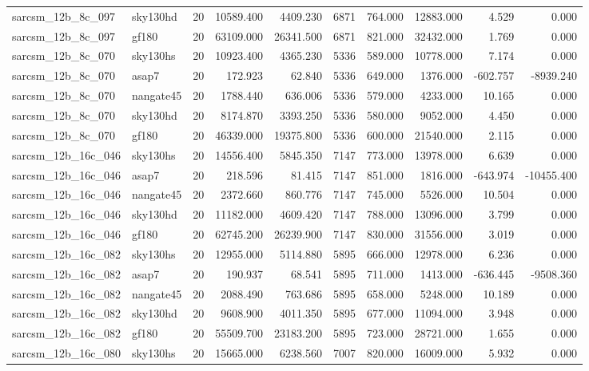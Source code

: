 \begin{longtable}{llrrrrrrrr}
sarcsm\_12b\_8c\_097 & sky130hd & 20 & 10589.400 & 4409.230 & 6871 & 764.000 & 12883.000 & 4.529 & 0.000 \\
sarcsm\_12b\_8c\_097 & gf180 & 20 & 63109.000 & 26341.500 & 6871 & 821.000 & 32432.000 & 1.769 & 0.000 \\
sarcsm\_12b\_8c\_070 & sky130hs & 20 & 10923.400 & 4365.230 & 5336 & 589.000 & 10778.000 & 7.174 & 0.000 \\
sarcsm\_12b\_8c\_070 & asap7 & 20 & 172.923 & 62.840 & 5336 & 649.000 & 1376.000 & -602.757 & -8939.240 \\
sarcsm\_12b\_8c\_070 & nangate45 & 20 & 1788.440 & 636.006 & 5336 & 579.000 & 4233.000 & 10.165 & 0.000 \\
sarcsm\_12b\_8c\_070 & sky130hd & 20 & 8174.870 & 3393.250 & 5336 & 580.000 & 9052.000 & 4.450 & 0.000 \\
sarcsm\_12b\_8c\_070 & gf180 & 20 & 46339.000 & 19375.800 & 5336 & 600.000 & 21540.000 & 2.115 & 0.000 \\
sarcsm\_12b\_16c\_046 & sky130hs & 20 & 14556.400 & 5845.350 & 7147 & 773.000 & 13978.000 & 6.639 & 0.000 \\
sarcsm\_12b\_16c\_046 & asap7 & 20 & 218.596 & 81.415 & 7147 & 851.000 & 1816.000 & -643.974 & -10455.400 \\
sarcsm\_12b\_16c\_046 & nangate45 & 20 & 2372.660 & 860.776 & 7147 & 745.000 & 5526.000 & 10.504 & 0.000 \\
sarcsm\_12b\_16c\_046 & sky130hd & 20 & 11182.000 & 4609.420 & 7147 & 788.000 & 13096.000 & 3.799 & 0.000 \\
sarcsm\_12b\_16c\_046 & gf180 & 20 & 62745.200 & 26239.900 & 7147 & 830.000 & 31556.000 & 3.019 & 0.000 \\
sarcsm\_12b\_16c\_082 & sky130hs & 20 & 12955.000 & 5114.880 & 5895 & 666.000 & 12978.000 & 6.236 & 0.000 \\
sarcsm\_12b\_16c\_082 & asap7 & 20 & 190.937 & 68.541 & 5895 & 711.000 & 1413.000 & -636.445 & -9508.360 \\
sarcsm\_12b\_16c\_082 & nangate45 & 20 & 2088.490 & 763.686 & 5895 & 658.000 & 5248.000 & 10.189 & 0.000 \\
sarcsm\_12b\_16c\_082 & sky130hd & 20 & 9608.900 & 4011.350 & 5895 & 677.000 & 11094.000 & 3.948 & 0.000 \\
sarcsm\_12b\_16c\_082 & gf180 & 20 & 55509.700 & 23183.200 & 5895 & 723.000 & 28721.000 & 1.655 & 0.000 \\
sarcsm\_12b\_16c\_080 & sky130hs & 20 & 15665.000 & 6238.560 & 7007 & 820.000 & 16009.000 & 5.932 & 0.000 \\

\end{longtable}
